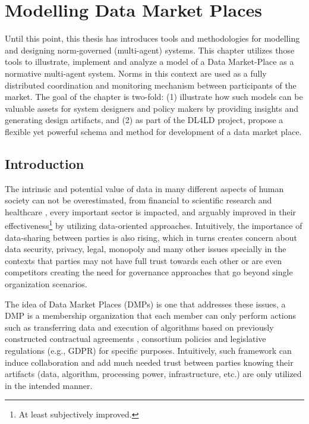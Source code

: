\chapter{Modelling Data Market Places}
\label{ch:cmf}

Until this point, this thesis has introduces tools and methodologies for modelling and designing norm-governed (multi-agent) systems. This chapter utilizes those tools to illustrate, implement and analyze a model of a Data Market-Place as a normative multi-agent system. Norms in this context are used as a fully distributed coordination and monitoring mechanism between participants of the market. The goal of the chapter is two-fold: (1) illustrate how such models can be valuable assets for system designers and policy makers by providing insights and generating design artifacts, and (2) as part of the DL4LD project, propose a flexible yet powerful schema and method for development of a data market place.

\section{Introduction}
The intrinsic and potential value of data in many different aspects of human society can not be overestimated, from financial \cite{Hasan2020} to scientific research \cite{Yuri2013} and healthcare \cite{Shilo2020}, every important sector is impacted, and arguably improved in their effectiveness\footnote{At least subjectively improved.} by utilizing data-oriented approaches. Intuitively, the importance of data-sharing between parties is also rising, which in turns creates concern about data security, privacy, legal, monopoly and many other issues specially in the contexts that parties may not have full trust towards each other or are even competitors \cite{clifton2004privacy} creating the need for governance approaches that go beyond single organization scenarios. 

The idea of Data Market Places (DMPs) is one that addresses these issues, a DMP is a membership organization that each member can only perform actions such as transferring data and execution of algorithms based on previously constructed contractual agreements \cite{Zhang2019ModelingPlaces,Shakeri2019}, consortium policies and legislative regulations (e.g., GDPR) for specific purposes. Intuitively, such framework can induce collaboration and add much needed trust between parties knowing their artifacts (data, algorithm, processing power, infrastructure, etc.) are only utilized in the intended manner.

